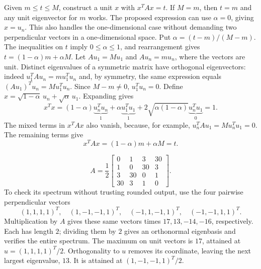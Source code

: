 \goal Given $m\le t\le M$, construct a unit $x$ with $x^TAx=t$.
If $M=m$, then $t=m$ and any unit eigenvector for $m$ works.
The proposed expression can use $\alpha=0$, giving $x=u_n$.
This also handles the one-dimensional case without demanding two
perpendicular vectors in a one-dimensional space.
Put $\alpha=(t-m)/(M-m)$. The inequalities on $t$ imply
$0\le\alpha\le1$, and rearrangement gives
$t=(1-\alpha)m+\alpha M$.
Let $Au_1=Mu_1$ and $Au_n=mu_n$, where the vectors are unit.
Distinct eigenvalues of a symmetric matrix have orthogonal eigenvectors:
indeed $u_1^TAu_n=m u_1^Tu_n$ and, by symmetry, the same expression
equals $(Au_1)^Tu_n=M u_1^Tu_n$. Since $M-m\ne0$,
$u_1^Tu_n=0$.
Define $x=\sqrt{1-\alpha}\,u_n+\sqrt\alpha\,u_1$. Expanding gives
\[
 x^Tx=(1-\alpha)\underbrace{u_n^Tu_n}_{1}
 +\alpha\underbrace{u_1^Tu_1}_{1}
 +2\sqrt{\alpha(1-\alpha)}\underbrace{u_n^Tu_1}_{0}=1.
\]
The mixed terms in $x^TAx$ also vanish, because, for example,
$u_n^TAu_1=M u_n^Tu_1=0$. The remaining terms give
\[
 x^TAx=(1-\alpha)m+\alpha M=t.
\]

\[
 A=\frac12\begin{bmatrix}0&1&3&30\\1&0&30&3\\3&30&0&1\\30&3&1&0\end{bmatrix}.
\]
To check its spectrum without trusting rounded output, use the four
pairwise perpendicular vectors
\[
 (1,1,1,1)^T,\quad(1,-1,-1,1)^T,\quad(-1,1,-1,1)^T,\quad(-1,-1,1,1)^T.
\]
Multiplication by $A$ gives these same vectors times $17,13,-14,-16$,
respectively. Each has length $2$; dividing them by $2$ gives an
orthonormal eigenbasis and verifies the entire spectrum.
The maximum on unit vectors is $17$, attained at $u=(1,1,1,1)^T/2$.
Orthogonality to $u$ removes its coordinate, leaving the next largest
eigenvalue, $13$. It is attained at $(1,-1,-1,1)^T/2$.

